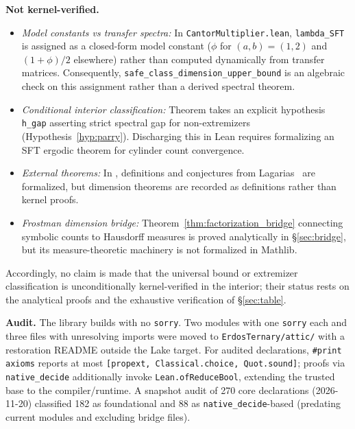 \documentclass[11pt,reqno]{amsart}
\theoremstyle{plain}
\theoremstyle{definition}
\theoremstyle{remark}
\begin{document}
{\textbf{Not kernel-verified.}
\begin{itemize}\setlength{\itemsep}{0pt}\setlength{\parsep}{0pt}\setlength{\parskip}{0pt}\setlength{\topsep}{1pt}\setlength{\partopsep}{0pt}
    \item \emph{Model constants vs transfer spectra:} In \texttt{CantorMultiplier.lean}, \texttt{lambda\_SFT} is assigned as a closed-form model constant ($\phi$ for $(a,b)=(1,2)$ and $(1+\phi)/2$ elsewhere) rather than computed dynamically from transfer matrices. Consequently, \texttt{safe\_class\_dimension\_upper\_bound} is an algebraic check on this assignment rather than a derived spectral theorem.
    \item \emph{Conditional interior classification:} Theorem  takes an explicit hypothesis \texttt{h\_gap} asserting strict spectral gap for non-extremizers (Hypothesis~\ref{hyp:parry}). Discharging this in Lean requires formalizing an SFT ergodic theorem for cylinder count convergence.
    \item \emph{External theorems:} In , definitions and conjectures from Lagarias~\cite{Lagarias2009} are formalized, but dimension theorems are recorded as definitions rather than kernel proofs.
    \item \emph{Frostman dimension bridge:} Theorem~\ref{thm:factorization_bridge} connecting symbolic counts to Hausdorff measures is proved analytically in §\ref{sec:bridge}, but its measure-theoretic machinery is not formalized in Mathlib.
\end{itemize}
Accordingly, no claim is made that the universal bound or extremizer classification is unconditionally kernel-verified in the interior; their status rests on the analytical proofs and the exhaustive verification of \S\ref{sec:table}.

\textbf{Audit.} The library builds with no \texttt{sorry}. Two modules with one \texttt{sorry} each and three files with unresolving imports were moved to \texttt{ErdosTernary/attic/} with a restoration README outside the Lake target. For audited declarations, \texttt{\#print axioms} reports at most \texttt{[propext, Classical.choice, Quot.sound]}; proofs via \texttt{native\_decide} additionally invoke \texttt{Lean.ofReduceBool}, extending the trusted base to the compiler/runtime. A snapshot audit of 270 core declarations (2026-11-20) classified 182 as foundational and 88 as \texttt{native\_decide}-based (predating current modules and excluding bridge files).
}

\clearpage



\end{document}
